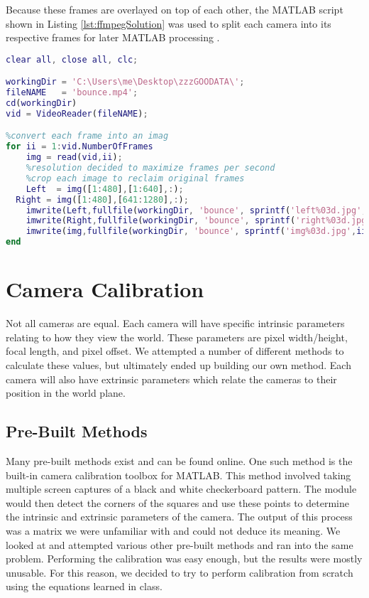 \documentclass{IEEEtran}
\begin{document}
Because these frames are overlayed on top of each other, the MATLAB script shown in Listing \ref{lst:ffmpegSolution} was used to split each camera into its respective frames for later MATLAB processing \cite{vidCrea}.

\begin{lstlisting}[caption={MATLAB Frame Splitting Code},label={lst:ffmpegSolution},language=MATLAB] 
clear all, close all, clc;

workingDir = 'C:\Users\me\Desktop\zzzGOODATA\';
fileNAME   = 'bounce.mp4';
cd(workingDir)
vid = VideoReader(fileNAME);

%convert each frame into an imag
for ii = 1:vid.NumberOfFrames
    img = read(vid,ii);
    %resolution decided to maximize frames per second
    %crop each image to reclaim original frames
    Left  = img([1:480],[1:640],:);
  Right = img([1:480],[641:1280],:);
    imwrite(Left,fullfile(workingDir, 'bounce', sprintf('left%03d.jpg',ii)));
    imwrite(Right,fullfile(workingDir, 'bounce', sprintf('right%03d.jpg',ii)));
    imwrite(img,fullfile(workingDir, 'bounce', sprintf('img%03d.jpg',ii)));
end
\end{lstlisting}

\section{Camera Calibration}
Not all cameras are equal. Each camera will have specific intrinsic parameters relating to how they view the world. These parameters are pixel width/height, focal length, and pixel offset. We attempted a number of different methods to calculate these values, but ultimately ended up building our own method. Each camera will also have extrinsic parameters which relate the cameras to their position in the world plane.

\subsection{Pre-Built Methods}
Many pre-built methods exist and can be found online. One such method is the built-in camera calibration toolbox for MATLAB. This method involved taking multiple screen captures of a black and white checkerboard pattern. The module would then detect the corners of the squares and use these points to determine the intrinsic and extrinsic parameters of the camera. The output of this process was a matrix we were unfamiliar with and could not deduce its meaning. We looked at and attempted various other pre-built methods and ran into the same problem. Performing the calibration was easy enough, but the results were mostly unusable. For this reason, we decided to try to perform calibration from scratch using the equations learned in class. 
\end{document}
